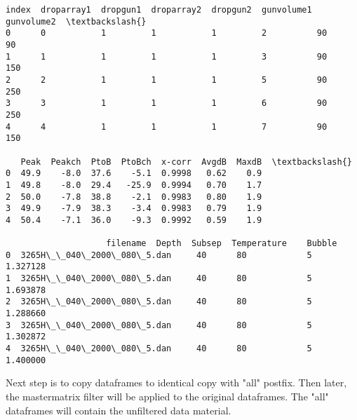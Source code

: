\documentclass[11pt]{article}
\begin{document}
    \begin{Verbatim}[commandchars=\\\{\}]
   index  droparray1  dropgun1  droparray2  dropgun2  gunvolume1  gunvolume2  \textbackslash{}
0      0           1         1           1         2          90          90   
1      1           1         1           1         3          90         150   
2      2           1         1           1         5          90         250   
3      3           1         1           1         6          90         250   
4      4           1         1           1         7          90         150   

   Peak  Peakch  PtoB  PtoBch  x-corr  AvgdB  MaxdB  \textbackslash{}
0  49.9    -8.0  37.6    -5.1  0.9998   0.62    0.9   
1  49.8    -8.0  29.4   -25.9  0.9994   0.70    1.7   
2  50.0    -7.8  38.8    -2.1  0.9983   0.80    1.9   
3  49.9    -7.9  38.3    -3.4  0.9983   0.79    1.9   
4  50.4    -7.1  36.0    -9.3  0.9992   0.59    1.9   

                    filename  Depth  Subsep  Temperature    Bubble  
0  3265H\_\_040\_2000\_080\_5.dan     40      80            5  1.327128  
1  3265H\_\_040\_2000\_080\_5.dan     40      80            5  1.693878  
2  3265H\_\_040\_2000\_080\_5.dan     40      80            5  1.288660  
3  3265H\_\_040\_2000\_080\_5.dan     40      80            5  1.302872  
4  3265H\_\_040\_2000\_080\_5.dan     40      80            5  1.400000  

    \end{Verbatim}

    Next step is to copy dataframes to identical copy with "all" postfix.
Then later, the mastermatrix filter will be applied to the original
dataframes. The "all" dataframes will contain the unfiltered data
material.
\end{document}
